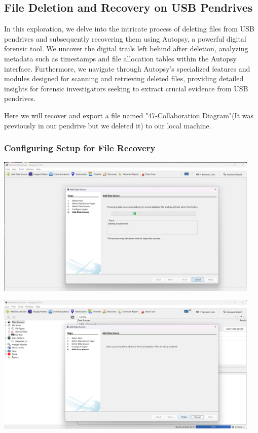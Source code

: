 \documentclass{article}
\begin{document}
\subsection{File Deletion and Recovery on USB Pendrives}
 In this exploration, we delve into the intricate process of deleting files from USB pendrives and subsequently recovering them using Autopsy, a powerful digital forensic tool. We uncover the digital trails left behind after deletion, analyzing metadata such as timestamps and file allocation tables within the Autopsy interface. Furthermore, we navigate through Autopsy's specialized features and modules designed for scanning and retrieving deleted files, providing detailed insights for forensic investigators seeking to extract crucial evidence from USB pendrives.

 Here we will recover and export a file named "47-Collaboration Diagram"(It was previously in our pendrive but we deleted it) to our local machine.

\subsubsection*{Configuring Setup for File Recovery}
\begin{center}
    \includegraphics[width=0.95\textwidth]{4.3/Screenshot (414).png}
\end{center}

\begin{center}
    \includegraphics[width=0.95\textwidth]{4.3/Screenshot (415).png}
\end{center}
\end{document}

